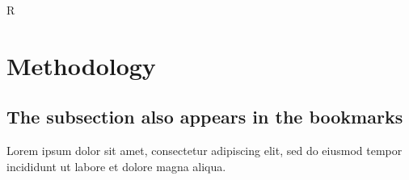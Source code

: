 R%

\section{Methodology}

\subsection{The subsection also appears in the bookmarks}

Lorem ipsum dolor sit amet, consectetur adipiscing elit, sed do eiusmod tempor incididunt ut labore et dolore magna aliqua.